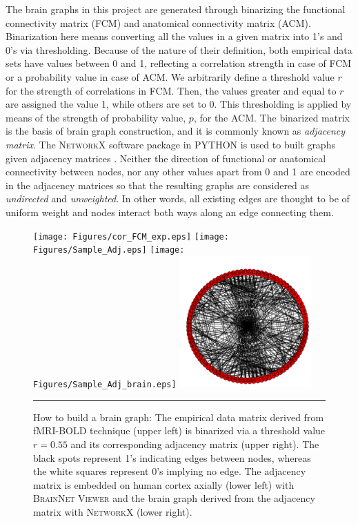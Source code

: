 The brain graphs in this project are generated through binarizing the functional connectivity matrix (FCM) and anatomical connectivity matrix (ACM). Binarization here means converting all the values in a given matrix into 1's and 0's via thresholding. Because of the nature of their definition, both empirical data sets have values between 0 and 1, reflecting a correlation strength in case of FCM or a probability value in case of ACM. We arbitrarily define a threshold value $r$ for the strength of correlations in FCM. Then, the values greater and equal to $r$ are assigned the value 1, while others are set to 0. This thresholding is applied by means of the strength of probability value, $p$, for the ACM. The binarized matrix is the basis of brain graph construction, and it is commonly known as \textit{adjacency matrix}. The \textsc{NetworkX} software package in \textsc{PYTHON} is used to built graphs given adjacency matrices \citep{XYZNETW}. Neither the direction of functional or anatomical connectivity between nodes, nor any other values apart from 0 and 1  are encoded in the adjacency matrices  so that the resulting graphs are considered as \textit{undirected} and \textit{unweighted}. In other words, all existing edges are thought to be of uniform weight and nodes interact both ways along an edge connecting them. 

\begin{figure}[htbp]
  \centering
	 \texttt{[image: Figures/cor\_FCM\_exp.eps]} 
	 \texttt{[image: Figures/Sample\_Adj.eps]} 
	\texttt{[image: Figures/Sample\_Adj\_brain.eps]}  
   \includegraphics[width=0.45\textwidth]{Figures/brain_graph.png}      

    \rule{35em}{0.5pt}
  \caption[Binarizing via thresholding]{How to build a brain graph: The empirical data matrix derived from fMRI-BOLD technique (upper left) is binarized via a threshold value $r=0.55$ and its corresponding adjacency matrix (upper right). The black spots represent 1's indicating edges between nodes, whereas the white squares represent 0's implying no edge. The adjacency matrix is embedded on human cortex axially (lower left) with \textsc{BrainNet Viewer} \citep{XYZ13} and the brain graph derived from the adjacency matrix with \textsc{NetworkX} \citep{XYZNETW}(lower right).}
  \label{fig:Binarizing via thresholding}
\end{figure}

